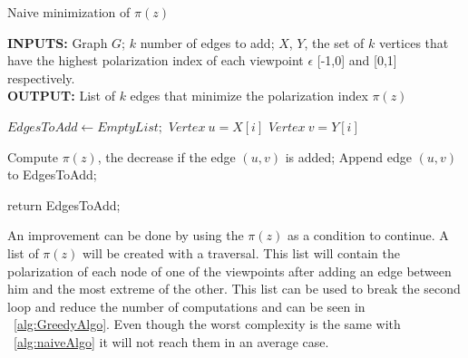 \vspace{10pt}

\begin{algorithm}[htbp]
	\caption{Naive minimization of $\pi(z)$}
	\label{alg:naiveAlgo}
	\begin{flushleft}
        		\textbf{INPUTS:} Graph $G$; $k$ number of edges to add;
		$X$, $Y $, the set of $k$ vertices that have the highest polarization index of each viewpoint $\epsilon$ [-1,0] and [0,1] respectively.\\
		\vspace{6pt}
        		\textbf{OUTPUT:} List of $k$ edges that minimize the polarization index $\pi(z)$
	\end{flushleft}
	\begin{algorithmic}[1]
		\STATE $EdgesToAdd \leftarrow Empty List;$
		\STATE $Vertex \ u = X[i]$
		\STATE $Vertex \ v = Y[i]$
		
			\STATE Compute $\pi(z)$, the decrease if the edge $(u,v)$ is added;
			\STATE Append edge $(u,v)$ to EdgesToAdd;
		
				\STATE return EdgesToAdd;
			\ENDIF
		\ENDIF
		\ENDFOR
		\ENDFOR
	\end{algorithmic}
\end{algorithm}

An improvement can be done by using the $\pi(z)$ as a condition to continue. A list of $\pi(z)$ will be created with a traversal. This list will contain the polarization of each node of one of the viewpoints after adding an edge between him and the most extreme of the other.
This list can be used to break the second loop and reduce the number of computations and can be seen in ~\ref{alg:GreedyAlgo}. Even though the worst complexity is the same with ~\ref{alg:naiveAlgo} it will not reach them in an average case.

